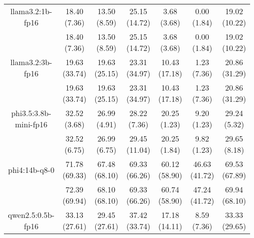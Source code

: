 \begin{table}[]
{\begin{tabular}{ccccccc}
        \multicolumn{1}{c|}{llama3.2:1b-fp16} & 18.40 (7.36) & 13.50 (8.59) & \multicolumn{1}{c|}{25.15 (14.72)} & 3.68 (3.68) & \multicolumn{1}{c|}{0.00 (1.84)} & 19.02 (10.22) \\
        
        

        \multicolumn{1}{c|}{} & 18.40 (7.36) & 13.50 (8.59) & \multicolumn{1}{c|}{25.15 (14.72)} & 3.68 (3.68) & \multicolumn{1}{c|}{0.00 (1.84)} & 19.02 (10.22) \\
        \cline{1-7}
        

        \multicolumn{1}{c|}{llama3.2:3b-fp16} & 19.63 (33.74) & 19.63 (25.15) & \multicolumn{1}{c|}{23.31 (34.97)} & 10.43 (17.18) & \multicolumn{1}{c|}{1.23 (7.36)} & 20.86 (31.29) \\
        
        

        \multicolumn{1}{c|}{} & 19.63 (33.74) & 19.63 (25.15) & \multicolumn{1}{c|}{23.31 (34.97)} & 10.43 (17.18) & \multicolumn{1}{c|}{1.23 (7.36)} & 20.86 (31.29) \\
        \cline{1-7}
        

        \multicolumn{1}{c|}{phi3.5:3.8b-mini-fp16} & 32.52 (3.68) & 26.99 (4.91) & \multicolumn{1}{c|}{28.22 (7.36)} & 20.25 (1.23) & \multicolumn{1}{c|}{9.20 (1.23)} & 29.24 (5.32) \\
        
        

        \multicolumn{1}{c|}{} & 32.52 (6.75) & 26.99 (6.75) & \multicolumn{1}{c|}{29.45 (11.04)} & 20.25 (1.84) & \multicolumn{1}{c|}{9.82 (1.23)} & 29.65 (8.18) \\
        \cline{1-7}
        

        \multicolumn{1}{c|}{phi4:14b-q8-0} & 71.78 (69.33) & 67.48 (68.10) & \multicolumn{1}{c|}{69.33 (66.26)} & 60.12 (58.90) & \multicolumn{1}{c|}{46.63 (41.72)} & 69.53 (67.89) \\
        
        

        \multicolumn{1}{c|}{} & 72.39 (69.94) & 68.10 (68.10) & \multicolumn{1}{c|}{69.33 (66.26)} & 60.74 (58.90) & \multicolumn{1}{c|}{47.24 (41.72)} & 69.94 (68.10) \\
        \cline{1-7}
        

        \multicolumn{1}{c|}{qwen2.5:0.5b-fp16} & 33.13 (27.61) & 29.45 (27.61) & \multicolumn{1}{c|}{37.42 (33.74)} & 17.18 (14.11) & \multicolumn{1}{c|}{8.59 (7.36)} & 33.33 (29.65) \\
        

\end{tabular}}
\end{table}
